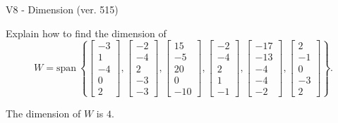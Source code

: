 \begin{exercise}
  \begin{exerciseTitle}V8 - Dimension (ver. 515)\end{exerciseTitle}
  \begin{exerciseStatement}
    Explain how to find the dimension of 
\[W=\mathrm{span}\ \left\{\left[\begin{array}{r}
-3 \\
1 \\
-4 \\
0 \\
2
\end{array}\right] , \left[\begin{array}{r}
-2 \\
-4 \\
2 \\
-3 \\
-3
\end{array}\right] , \left[\begin{array}{r}
15 \\
-5 \\
20 \\
0 \\
-10
\end{array}\right] , \left[\begin{array}{r}
-2 \\
-4 \\
2 \\
1 \\
-1
\end{array}\right] , \left[\begin{array}{r}
-17 \\
-13 \\
-4 \\
-4 \\
-2
\end{array}\right] , \left[\begin{array}{r}
2 \\
-1 \\
0 \\
-3 \\
2
\end{array}\right]\right\}.\]



  \end{exerciseStatement}
  \begin{exerciseAnswer}
   The dimension of \(W\) is  \(4\).
  


  \end{exerciseAnswer}
\end{exercise}